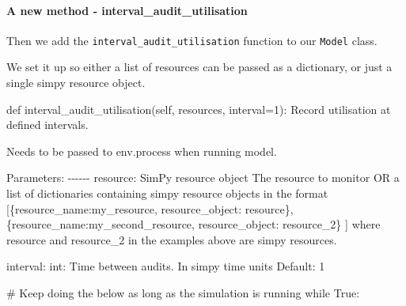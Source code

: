 \documentclass[
  letterpaper,
  DIV=11,
  numbers=noendperiod]{scrreprt}
\let\oldparagraph\paragraph
\renewcommand{\paragraph}[1]{\oldparagraph{#1}\mbox{}}
\newenvironment{Shaded}{}{}
\newcommand{\CommentTok}[1]{\textcolor[rgb]{0.42,0.45,0.49}{#1}}
\newcommand{\ControlFlowTok}[1]{\textcolor[rgb]{0.84,0.23,0.29}{#1}}
\newcommand{\DecValTok}[1]{\textcolor[rgb]{0.00,0.36,0.77}{#1}}
\newcommand{\KeywordTok}[1]{\textcolor[rgb]{0.84,0.23,0.29}{#1}}
\newcommand{\NormalTok}[1]{\textcolor[rgb]{0.14,0.16,0.18}{#1}}
\newcommand{\OperatorTok}[1]{\textcolor[rgb]{0.14,0.16,0.18}{#1}}
\newcommand{\VariableTok}[1]{\textcolor[rgb]{0.89,0.38,0.04}{#1}}
\begin{document}
\paragraph{A new method -
interval\_audit\_utilisation}\label{a-new-method---interval_audit_utilisation}

Then we add the \texttt{interval\_audit\_utilisation} function to our
\texttt{Model} class.

We set it up so either a list of resources can be passed as a
dictionary, or just a single simpy resource object.

\begin{Shaded}
\begin{Highlighting}[]
\KeywordTok{def}\NormalTok{ interval\_audit\_utilisation(}\VariableTok{self}\NormalTok{, resources, interval}\OperatorTok{=}\DecValTok{1}\NormalTok{):}
    \CommentTok{\textquotesingle{}\textquotesingle{}\textquotesingle{}}
\CommentTok{    Record utilisation at defined intervals.}

\CommentTok{    Needs to be passed to env.process when running model.}

\CommentTok{    Parameters:}
\CommentTok{    {-}{-}{-}{-}{-}{-}}
\CommentTok{    resource: SimPy resource object}
\CommentTok{        The resource to monitor}
\CommentTok{        OR}
\CommentTok{        a list of dictionaries containing simpy resource objects in the format}
\CommentTok{        [\{\textquotesingle{}resource\_name\textquotesingle{}:\textquotesingle{}my\_resource\textquotesingle{}, \textquotesingle{}resource\_object\textquotesingle{}: resource\},}
\CommentTok{        \{\textquotesingle{}resource\_name\textquotesingle{}:\textquotesingle{}my\_second\_resource\textquotesingle{}, \textquotesingle{}resource\_object\textquotesingle{}: resource\_2\}}
\CommentTok{        ]}
\CommentTok{        where resource and resource\_2 in the examples above are simpy resources.}

\CommentTok{    interval: int:}
\CommentTok{        Time between audits.}
\CommentTok{        In simpy time units}
\CommentTok{        Default: 1}
\CommentTok{    \textquotesingle{}\textquotesingle{}\textquotesingle{}}

    \CommentTok{\# Keep doing the below as long as the simulation is running}
    \ControlFlowTok{while} \VariableTok{True}\NormalTok{:}


\end{Highlighting}
\end{Shaded}
\end{document}
